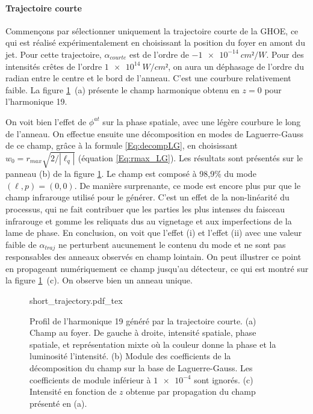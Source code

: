 \paragraph*{Trajectoire courte} Commençons par sélectionner uniquement la trajectoire courte de la GHOE, ce qui est réalisé expérimentalement en choisissant la position du foyer en amont du jet. Pour cette trajectoire, $\alpha_{courte}$ est de l'ordre de $\SI{-1e-14}{cm²/W}$. Pour des intensités crêtes de l'ordre $\SI{1e14}{W/cm²}$, on aura un déphasage de l'ordre du radian entre le centre et le bord de l'anneau. C'est une courbure relativement faible. La figure \ref{Fig:DecompShort}~(a) présente le champ harmonique obtenu en $z=0$ pour l'harmonique 19.

On voit bien l'effet de $\phi^{at}$ sur la phase spatiale, avec une légère courbure le long de l'anneau. On effectue ensuite une décomposition en modes de Laguerre-Gauss de ce champ, grâce à la formule \ref{Eq:decompLG}, en choisissant $w_0 = r_{max}\sqrt{2/|\ell_q|}$ (équation \ref{Eq:rmax_LG}). Les résultats sont présentés sur le panneau (b) de la figure \ref{Fig:DecompShort}. Le champ est composé à 98,9\% du mode $(\ell,p) = (0,0)$. De manière surprenante, ce mode est encore plus pur que le champ infrarouge utilisé pour le générer. C'est un effet de la non-linéarité du processus, qui ne fait contribuer que les parties les plus intenses du faisceau infrarouge et gomme les reliquats dus au vignetage et aux imperfections de la lame de phase. En conclusion, on voit que l'effet (i) et l'effet (ii) avec une valeur faible de $\alpha_{traj}$ ne perturbent aucunement le contenu du mode et ne sont pas responsables des anneaux observés en champ lointain. On peut illustrer ce point en propageant numériquement ce champ jusqu'au détecteur, ce qui est montré sur la figure \ref{Fig:DecompShort}~(c). On observe bien un anneau unique.
\begin{figure}[!ht]
\centering
\def\svgwidth{\columnwidth}
{short_trajectory.pdf_tex}
\caption{Profil de l'harmonique 19 généré par la trajectoire courte. (a) Champ au foyer. De gauche à droite, intensité spatiale, phase spatiale, et représentation mixte où la couleur donne la phase et la luminosité l'intensité. (b) Module des coefficients de la décomposition du champ sur la base de Laguerre-Gauss. Les coefficients de module inférieur à $\num{1e-4}$ sont ignorés. (c) Intensité en fonction de $z$ obtenue par propagation du champ présenté en (a).}
\label{Fig:DecompShort}
\end{figure}

